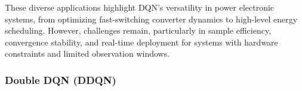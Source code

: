 



These diverse applications highlight DQN's versatility in power electronic systems, from optimizing fast-switching converter dynamics to high-level energy scheduling. However, challenges remain, particularly in sample efficiency, convergence stability, and real-time deployment for systems with hardware constraints and limited observation windows.

\subsubsection{Double DQN (DDQN)}  

